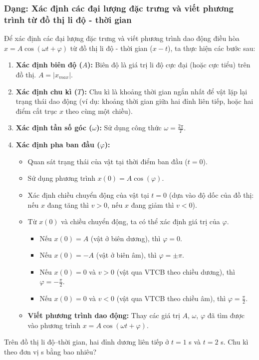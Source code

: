 \subsubsection{Dạng: Xác định các đại lượng đặc trưng và viết phương trình từ đồ thị li độ - thời gian}
\begin{phuongphap}
Để xác định các đại lượng đặc trưng và viết phương trình dao động điều hòa $x = A\cos(\omega t + \varphi)$ từ đồ thị li độ - thời gian ($x-t$), ta thực hiện các bước sau:
\begin{enumerate}
    \item \textbf{Xác định biên độ ($A$):} Biên độ là giá trị li độ cực đại (hoặc cực tiểu) trên đồ thị. $A = |x_{max}|$.
    \item \textbf{Xác định chu kì ($T$):} Chu kì là khoảng thời gian ngắn nhất để vật lặp lại trạng thái dao động (ví dụ: khoảng thời gian giữa hai đỉnh liên tiếp, hoặc hai điểm cắt trục $x$ theo cùng một chiều).
    \item \textbf{Xác định tần số góc ($\omega$):} Sử dụng công thức $\omega = \frac{2\pi}{T}$.
    \item \textbf{Xác định pha ban đầu ($\varphi$):}
    \begin{itemize}
        \item Quan sát trạng thái của vật tại thời điểm ban đầu ($t=0$).
        \item Sử dụng phương trình $x(0) = A\cos(\varphi)$.
        \item Xác định chiều chuyển động của vật tại $t=0$ (dựa vào độ dốc của đồ thị: nếu $x$ đang tăng thì $v>0$, nếu $x$ đang giảm thì $v<0$).
        \item Từ $x(0)$ và chiều chuyển động, ta có thể xác định giá trị của $\varphi$.
        \begin{itemize}
            \item Nếu $x(0) = A$ (vật ở biên dương), thì $\varphi = 0$.
            \item Nếu $x(0) = -A$ (vật ở biên âm), thì $\varphi = \pm \pi$.
            \item Nếu $x(0) = 0$ và $v>0$ (vật qua VTCB theo chiều dương), thì $\varphi = -\frac{\pi}{2}$.
            \item Nếu $x(0) = 0$ và $v<0$ (vật qua VTCB theo chiều âm), thì $\varphi = \frac{\pi}{2}$.
        \end{itemize}
    \item \textbf{Viết phương trình dao động:} Thay các giá trị $A$, $\omega$, $\varphi$ đã tìm được vào phương trình $x = A\cos(\omega t + \varphi)$.
    \end{itemize}
\end{enumerate}
\end{phuongphap}
\begin{vidumau}
Trên đồ thị li độ–thời gian, hai đỉnh dương liên tiếp ở $t=1$ s và $t=2$ s. Chu kì theo đơn vị s bằng bao nhiêu?
\end{vidumau}

